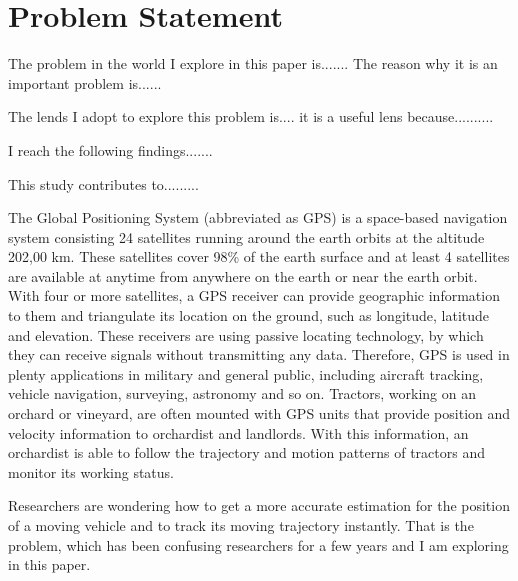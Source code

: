 
\section{Problem Statement}


The problem in the world I explore in this paper is....... 
The reason why it is an important problem is......

The lends I adopt to explore this problem is.... it is a useful lens because..........

I reach the following findings.......

This study contributes to.........





The Global Positioning System (abbreviated as GPS) is a space-based navigation system consisting 24 satellites running around the earth orbits at the altitude 202,00 km. These satellites cover 98\% of the earth surface and at least 4 satellites are available at anytime from anywhere on the earth or near the earth orbit. With four or more satellites, a GPS receiver can provide geographic information to them and triangulate its location on the ground, such as longitude, latitude and elevation. These receivers are using passive locating technology, by which they can receive signals without transmitting any data. Therefore, GPS is used in plenty applications in military and general public, including aircraft tracking, vehicle navigation, surveying, astronomy and so on. Tractors, working on an orchard or vineyard, are often mounted with GPS units that provide position and velocity information to orchardist and landlords. With this information, an orchardist is able to follow the trajectory and motion patterns of tractors and monitor its working status. 

Researchers are wondering how to get a more accurate estimation for the position of a moving vehicle and to track its moving trajectory instantly.  That is the problem, which has been confusing researchers for a few years and I am exploring in this paper. 


